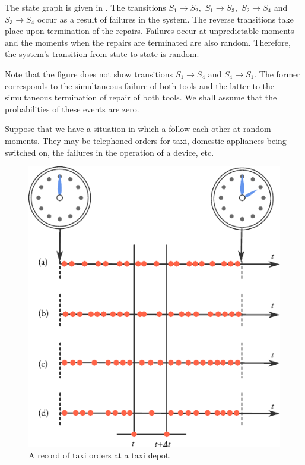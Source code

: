 The state graph is given in . The transitions
$S_{1} \to S_{2}, \,\, S_{1} \to S_{3}, \,\, S_{2} \to S_{4}$ and
$S_{3} \to S_{4}$ occur as a result of failures in the system. The
reverse transitions take place upon termination of the
repairs. Failures occur at unpredictable moments and the moments when
the repairs are terminated are also random. Therefore, the system's
transition from state to state is random.



 Note that the figure does not show transitions $S_{1} \to S_{4}$ and
 $S_{4} \to S_{1}$.  The former corresponds to the simultaneous
 failure of both tools and the latter to the simultaneous termination
 of repair of both tools. We shall assume that the probabilities of
 these events are zero.

  Suppose that we have a situation in which a
  follow each other at random moments. They
 may be telephoned orders for taxi, domestic appliances being switched
 on, the failures in the operation of a device, etc.

 \begin{figure}[!ht]
 \centering
 \includegraphics[width=0.85\tfwidth]{figures/event-arrival.pdf}
\caption{A record of taxi orders at a taxi depot.\label{event-arrival}}
 \end{figure}



